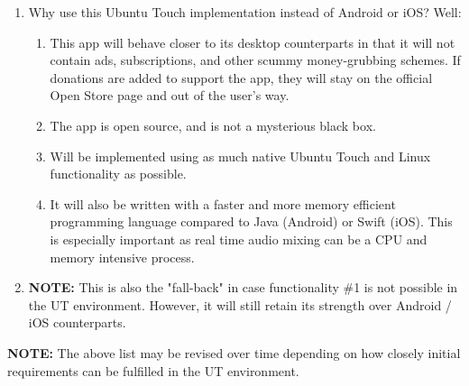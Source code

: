 \begin{enumerate}
\begin{enumerate}
		\item Why use this Ubuntu Touch implementation instead of Android or iOS? Well:
		\begin{enumerate}
			\item This app will behave closer to its desktop counterparts in that it will not contain ads, subscriptions, and other scummy money-grubbing schemes. If donations are added to support the app, they will stay on the official Open Store page and out of the user's way.
			\item The app is open source, and is not a mysterious black box.
			\item Will be implemented using as much native Ubuntu Touch and Linux functionality as possible.
			\item It will also be written with a faster and more memory efficient programming language compared to Java (Android) or Swift (iOS). This is especially important as real time audio mixing can be a CPU and memory intensive process.
		\end{enumerate}
		
		\item \textbf{NOTE: } This is also the "fall-back" in case functionality \#1 is not possible in the UT environment. However, it will still retain its strength over Android / iOS counterparts.
	\end{enumerate}
\end{enumerate}


\textbf{NOTE:} The above list may be revised over time depending on how closely initial requirements can be fulfilled in the UT environment.
